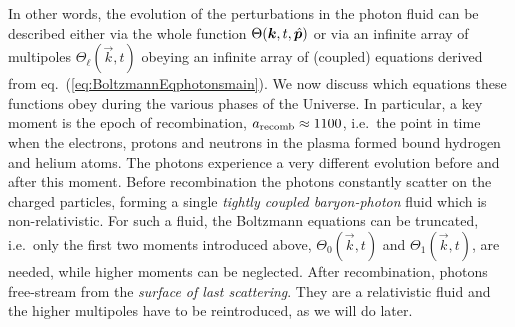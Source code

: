 In other words, the evolution of the perturbations in the photon fluid can be described either via the whole function $\Theta(\bm{k}, t, \hat{\bm{p}})$ or via an infinite array of multipoles  $\Theta_\ell(\vec k, t)$ obeying an infinite array of (coupled) equations derived from eq.~(\ref{eq:BoltzmannEqphotonsmain}).
We now discuss which equations these functions obey during the various phases of the Universe. In particular, a key moment is the epoch of recombination, $a_{\rm recomb}\approx 1100$, i.e.~the point in time when the electrons, protons and neutrons in the plasma formed bound hydrogen and helium atoms.
The photons experience a very different evolution before and after this moment. Before recombination the photons constantly scatter on the charged particles, forming a single {\em tightly coupled baryon-photon} fluid which is non-relativistic. 
For such a fluid, the Boltzmann equations can be truncated, i.e.~only the first two moments introduced above, $\Theta_{0}(\vec k, t)$ and $\Theta_{1}(\vec k, t)$, are needed, while higher moments can be neglected. 
After recombination, photons free-stream from the {\em surface of last scattering}. 
They are a relativistic fluid and the higher multipoles have to be reintroduced, as we will do later.


